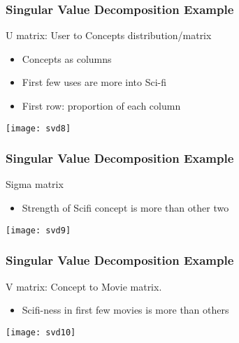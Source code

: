 \begin{frame}[fragile]
\frametitle{Singular Value Decomposition Example}
U matrix: User to Concepts distribution/matrix
\begin{itemize}

	\item Concepts as columns
	\item First few uses are more into Sci-fi
	\item First row: proportion of each column
\end{itemize}

\begin{center}
\texttt{[image: svd8]}
\end{center}
\end{frame}

\begin{frame}[fragile]
\frametitle{Singular Value Decomposition Example}
Sigma matrix
\begin{itemize}
	\item Strength of Scifi concept is more than other two
\end{itemize}

\begin{center}
\texttt{[image: svd9]}
\end{center}
\end{frame}

\begin{frame}[fragile]
\frametitle{Singular Value Decomposition Example}
V matrix:  Concept to Movie matrix.
\begin{itemize}
	\item Scifi-ness in first few movies is more than others
\end{itemize}

\begin{center}
\texttt{[image: svd10]}
\end{center}
\end{frame}

